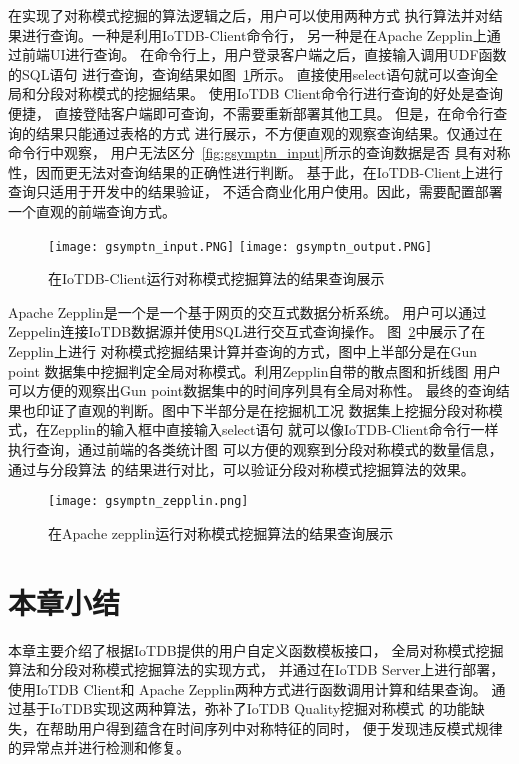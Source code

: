 在实现了对称模式挖掘的算法逻辑之后，用户可以使用两种方式
执行算法并对结果进行查询。一种是利用IoTDB-Client命令行，
另一种是在Apache Zepplin上通过前端UI进行查询。
在命令行上，用户登录客户端之后，直接输入调用UDF函数的SQL语句
进行查询，查询结果如图~\ref{fig:iotdb_client_symptn}所示。
直接使用select语句就可以查询全局和分段对称模式的挖掘结果。
使用IoTDB Client命令行进行查询的好处是查询便捷，
直接登陆客户端即可查询，不需要重新部署其他工具。
但是，在命令行查询的结果只能通过表格的方式
进行展示，不方便直观的观察查询结果。仅通过在命令行中观察，
用户无法区分~\ref{fig:gsymptn_input}所示的查询数据是否
具有对称性，因而更无法对查询结果的正确性进行判断。
基于此，在IoTDB-Client上进行查询只适用于开发中的结果验证，
不适合商业化用户使用。因此，需要配置部署一个直观的前端查询方式。
\begin{figure}
    \centering
    {\texttt{[image: gsymptn\_input.PNG]}}
    {\texttt{[image: gsymptn\_output.PNG]}}
    \caption{在IoTDB-Client运行对称模式挖掘算法的结果查询展示}
    \label{fig:iotdb_client_symptn}
\end{figure}

Apache Zepplin是一个是一个基于网页的交互式数据分析系统。
用户可以通过Zeppelin连接IoTDB数据源并使用SQL进行交互式查询操作。
图~\ref{fig:iotdb_zepplin_symptn}中展示了在Zepplin上进行
对称模式挖掘结果计算并查询的方式，图中上半部分是在Gun point
数据集中挖掘判定全局对称模式。利用Zepplin自带的散点图和折线图
用户可以方便的观察出Gun point数据集中的时间序列具有全局对称性。
最终的查询结果也印证了直观的判断。图中下半部分是在挖掘机工况
数据集上挖掘分段对称模式，在Zepplin的输入框中直接输入select语句
就可以像IoTDB-Client命令行一样执行查询，通过前端的各类统计图
可以方便的观察到分段对称模式的数量信息，通过与分段算法
的结果进行对比，可以验证分段对称模式挖掘算法的效果。

\begin{figure}
    \centering
    \texttt{[image: gsymptn\_zepplin.png]}
    \caption{在Apache zepplin运行对称模式挖掘算法的结果查询展示}
    \label{fig:iotdb_zepplin_symptn}
\end{figure}


\section{本章小结}
本章主要介绍了根据IoTDB提供的用户自定义函数模板接口，
全局对称模式挖掘算法和分段对称模式挖掘算法的实现方式，
并通过在IoTDB Server上进行部署，使用IoTDB Client和
Apache Zepplin两种方式进行函数调用计算和结果查询。
通过基于IoTDB实现这两种算法，弥补了IoTDB Quality挖掘对称模式
的功能缺失，在帮助用户得到蕴含在时间序列中对称特征的同时，
便于发现违反模式规律的异常点并进行检测和修复。